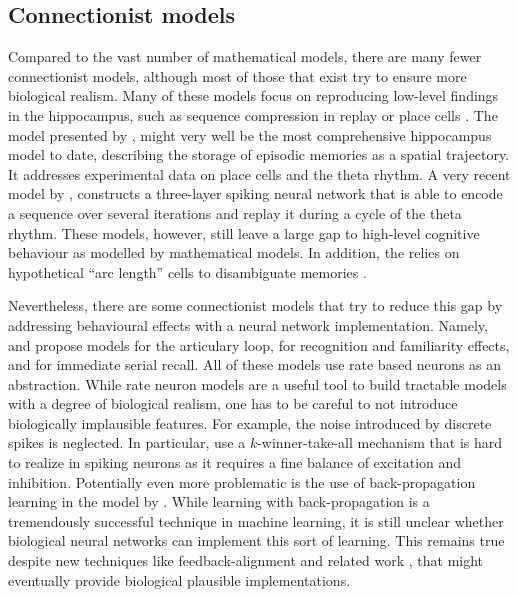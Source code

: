 \subsection{Connectionist models}
Compared to the vast number of mathematical models, there are many fewer connectionist models, although most of those that exist try to ensure more biological realism.
Many of these models focus on reproducing low-level findings in the hippocampus, such as sequence compression in replay \parencite{Levy2005} or place cells \parencite{Milford2004}.
The model presented by \textcite{Hasselmo2012}, might very well be the most comprehensive hippocampus model to date, describing the storage of episodic memories as a spatial trajectory.
It addresses experimental data on place cells and the theta rhythm.
A very recent model by \textcite{yu2017}, constructs a three-layer spiking neural network that is able to encode a sequence over several iterations and replay it during a cycle of the theta rhythm.
These models, however, still leave a large gap to high-level cognitive behaviour as modelled by mathematical models.
In addition, the \textcite{Hasselmo2012} relies on hypothetical ``arc length'' cells to disambiguate memories \parencite[cp.][]{Robins2014}.

Nevertheless, there are some connectionist models that try to reduce this gap by addressing behavioural effects with a neural network implementation.
Namely, \textcite{Burgess1992} and \textcite{Burgess1996} propose models for the articulary loop, \textcite{Norman2003} for recognition and familiarity effects, and \textcite{Botvinick2006} for immediate serial recall.
All of these models use rate based neurons as an abstraction.
While rate neuron models are a useful tool to build tractable models with a degree of biological realism, one has to be careful to not introduce biologically implausible features.
For example, the noise introduced by discrete spikes is neglected.
In particular, \textcite{Norman2003} use a $k$-winner-take-all mechanism that is hard to realize in spiking neurons as it requires a fine balance of excitation and inhibition.
Potentially even more problematic is the use of back-propagation learning in the model by \textcite{Botvinick2006}.
While learning with back-propagation is a tremendously successful technique in machine learning, it is still unclear whether biological neural networks can implement this sort of learning.
This remains true despite new techniques like feedback-alignment \parencite{lillicrap2016} and related work \parencite{bengio2015}, that might eventually provide biological plausible implementations.

